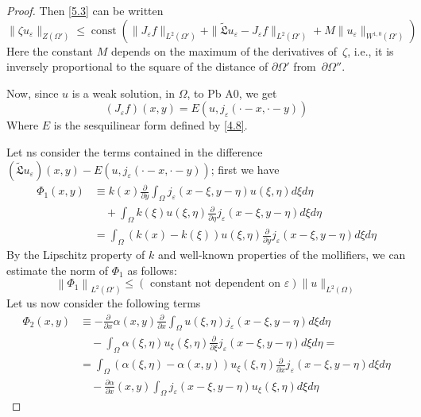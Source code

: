\documentclass[a4paper,12pt,leqno]{article}
\numberwithin{equation}{section}
\begin{document}
\begin{proof}
Then \eqref{5.3} can be written
\begin{equation} \label{5.4}
	\| \zeta u_\varepsilon \|_{Z(\Omega')} \leqslant
	\operatorname{const} \left(
	\| J_\varepsilon f \|_{L^2(\Omega')} + 
	\| \tilde{\mathfrak{L}} u_\varepsilon - J_\varepsilon f \|_{L^2(\Omega')} + 
	M \| u_\varepsilon \|_{W^{1,0}(\Omega')}
	\right)
\end{equation}
Here the constant $M$ depends on the maximum of the derivatives of~$\zeta$, i.e., it is inversely proportional to the square of the distance of $\partial \Omega'$ from~$\partial \Omega''$.

Now, since $u$ is a weak solution, in $\Omega$, to Pb A0, we get
\begin{equation}
	\left(J_{\varepsilon} f\right)(x, y)=E\left(u, j_{\varepsilon}(\cdot-x,\cdot-y)\right)
\end{equation}
Where $E$ is the sesquilinear form defined by \eqref{4.8}.

\newpage

Let ns consider the terms contained in the difference $(\tilde{\mathfrak{L}} u_{\varepsilon})(x, y)-E(u, j_{\varepsilon}(\cdot-x,\cdot-y))$; first we have
\begin{equation*}
	\begin{split}
		\Phi_{1}(x, y) & \equiv k(x) \frac{\partial}{\partial y} \int_{\Omega} j_{\varepsilon}(x-\xi, y-\eta) u(\xi, \eta) d \xi d \eta \\
		& \quad +\int_{\Omega} k(\xi) u(\xi, \eta) \frac{\partial}{\partial \eta} j_{\varepsilon}(x-\xi, y-\eta) d \xi d \eta \\
		& =\int_{\Omega}(k(x)-k(\xi)) u(\xi, \eta) \frac{\partial}{\partial y} j_{\varepsilon}(x-\xi, y-\eta) d \xi d \eta
	\end{split}
\end{equation*}
By the Lipschitz property of $k$ and well-known properties of the mollifiers, we can estimate the norm of $\Phi_{1}$ as follows:
\begin{equation*}
	\left\|\Phi_{1}\right\|_{L^{2}\left(\Omega'\right)} \leqslant (\text { constant not dependent on } \varepsilon) \|u\|_{L^{2}(\Omega)}
\end{equation*}
Let us now consider the following terms
\begin{equation*}
	\begin{split}
		\Phi_{2}(x, y) & \equiv-\frac{\partial}{\partial x} \alpha(x, y) \frac{\partial}{\partial x} \int_{\Omega} u(\xi, \eta) j_{\varepsilon}(x-\xi, y-\eta) d \xi d \eta \\
		& \quad -\int_{\Omega} \alpha(\xi, \eta) u_{\xi}(\xi, \eta) \frac{\partial}{\partial \xi} j_{\varepsilon}(x-\xi, y-\eta) d \xi d \eta=\\
		&=\int_{\Omega}(\alpha(\xi, \eta)-\alpha(x, y)) u_{\xi}(\xi, \eta) \frac{\partial}{\partial x} j_{\varepsilon}(x-\xi, y-\eta) d \xi d \eta \\
		&\quad-\frac{\partial \alpha}{\partial x}(x, y) \int_{\Omega} j_{\varepsilon}(x-\xi, y-\eta) u_{\xi}(\xi, \eta) d \xi d \eta
	\end{split}
\end{equation*}


\end{proof}
\end{document}
